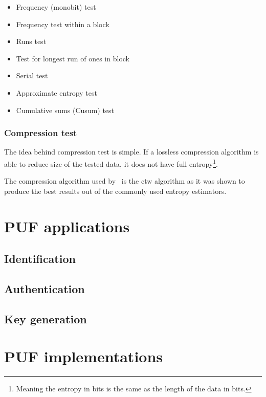 \begin{itemize}
    \item Frequency (monobit) test
    \item Frequency test within a block
    \item Runs test
    \item Test for longest run of ones in block
    \item Serial test
    \item Approximate entropy test
    \item Cumulative sums (Cusum) test
\end{itemize}

\subsubsection*{Compression test}

The idea behind compression test is simple. If a lossless compression algorithm is able to reduce size of the tested data, it does not have full entropy\footnote{Meaning the entropy in bits is the same as the length of the data in bits.}.

The compression algorithm used by~\cite{Leest2010} is the \gls{ctw} algorithm as it was shown to produce the best results out of the commonly used entropy estimators\cite{Yun2008}.

\section{PUF applications}\label{sec:puf_applications}

\subsection{Identification}\label{sec:identification}
\subsection{Authentication}
\subsection{Key generation}

\section{PUF implementations}

